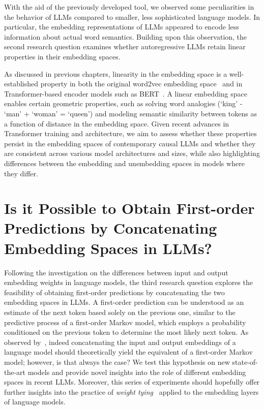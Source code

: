 With the aid of the previously developed tool, we observed some peculiarities in the behavior of LLMs compared to smaller, less sophisticated language models.
In particular, the embedding representations of LLMs appeared to encode less information about actual word semantics.
Building upon this observation, the second research question examines whether autoregressive LLMs retain linear properties in their embedding spaces.

As discussed in previous chapters, linearity in the embedding space is a well-established property in both the original word2vec embedding space~\cite{mikolov2013} and in Transformer-based encoder models such as BERT~\cite{devlin2019}.
A linear embedding space enables certain geometric properties, such as solving word analogies (`king' - `man' + `woman' = `queen') and modeling semantic similarity between tokens as a function of distance in the embedding space.
Given recent advances in Transformer training and architecture, we aim to assess whether these properties persist in the embedding spaces of contemporary causal LLMs and whether they are consistent across various model architectures and sizes, while also highlighting differences between the embedding and unembedding spaces in models where they differ.

\section[Is it Possible to Obtain First-order Predictions by Concatenating Embedding Spaces in LLMs?]{Is it Possible to Obtain First-order \texorpdfstring{ \\ }{} \mbox{Predictions} by \mbox{Concatenating} \texorpdfstring{ \\ }{} Embedding Spaces in LLMs?}\label{sec:rq_fom}

Following the investigation on the differences between input and output embedding weights in language models, the third research question explores the feasibility of obtaining first-order predictions by concatenating the two embedding spaces in LLMs.
A first-order prediction can be understood as an estimate of the next token based solely on the previous one, similar to the predictive process of a first-order Markov model, which employs a probability conditioned on the previous token to determine the most likely next token.
As observed by~\citet{elhage2021}, indeed concatenating the input and output embeddings of a language model should theoretically yield the equivalent of a first-order Markov model; however, is that always the case?
We test this hypothesis on new state-of-the-art models and provide novel insights into the role of different embedding spaces in recent LLMs.
Moreover, this series of experiments should hopefully offer further insights into the practice of \emph{weight tying}~\cite{inan2017,press2017} applied to the embedding layers of language models.
